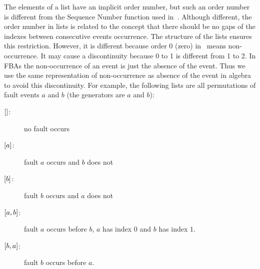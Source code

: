 The elements of a list have an implicit order number, but such an order number is different from the Sequence Number function used in~\cite{WP2009,Walker2009}.
Although different, the order number in lists is related to the concept that there should be no gaps of the indexes between consecutive events occurrence.
The structure of the lists ensures this restriction.
However, it is different because order 0 (zero) in~\cite{WP2009,Walker2009} means non-occurrence.
It may cause a discontinuity because 0 to 1 is different from 1 to 2.
In \acp{FBA} the non-occurrence of an event is just the absence of the event.
Thus we use the same representation of non-occurrence as absence of the event in \ac{algebra} to avoid this discontinuity.
For example, the following lists are all permutations of fault events $a$ and $b$ (the generators are $a$ and $b$):
\begin{description}
	\item[$[] $: ] no fault occurs
	\item[$\left[ a \right]$: ] fault $a$ occurs and $b$ does not
	\item[$\left[ b \right]$: ] fault $b$ occurs and $a$ does not
	\item[$\left[ a,b \right]$: ] fault $a$ occurs before $b$, $a$ has index $0$ and $b$ has index $1$.
	\item[$\left[ b,a \right]$: ] fault $b$ occurs before $a$.
\end{description}






